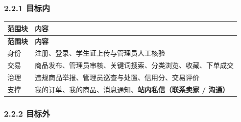\documentclass[12pt,a4paper]{ctexart}
\begin{document}
\subsubsection*{2.2.1 目标内}

{\footnotesize
\begin{longtable}{|p{2.75cm}|p{13.25cm}|}
\hline
\textbf{范围块} & \textbf{内容} \\
\hline
\endfirsthead
\hline
\textbf{范围块} & \textbf{内容} \\
\hline
\endhead
\hline
\endfoot
身份 & 注册、登录、学生证上传与管理员人工核验 \\
\hline
交易 & 商品发布、管理员审核、关键词搜索、分类浏览、收藏、下单成交 \\
\hline
治理 & 违规商品举报、管理员巡查与处置、信用分、交易评价 \\
\hline
支撑 & 我的订单、我的商品、消息通知、\textbf{站内私信（联系卖家 / 沟通）} \\
\hline
\end{longtable}
}


\subsubsection*{2.2.2 目标外}
\end{document}
